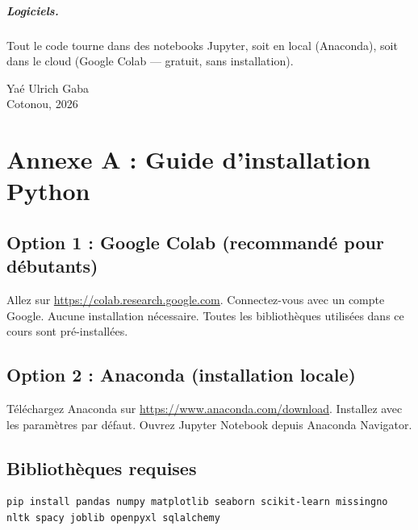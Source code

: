 \documentclass[12pt,a4paper,twoside]{book}
\begin{document}
\paragraph{Logiciels.} Tout le code tourne dans des notebooks Jupyter, soit en local (Anaconda), soit dans le cloud (Google Colab --- gratuit, sans installation).

\vfill
\noindent Yaé Ulrich Gaba\\
Cotonou, 2026

\mainmatter












\backmatter

\chapter*{Annexe A : Guide d'installation Python}

\section*{Option 1 : Google Colab (recommand\'e pour d\'ebutants)}
Allez sur \url{https://colab.research.google.com}. Connectez-vous avec un compte Google. Aucune installation n\'ecessaire. Toutes les biblioth\`eques utilis\'ees dans ce cours sont pr\'e-install\'ees.

\section*{Option 2 : Anaconda (installation locale)}
T\'el\'echargez Anaconda sur \url{https://www.anaconda.com/download}. Installez avec les param\`etres par d\'efaut. Ouvrez Jupyter Notebook depuis Anaconda Navigator.

\section*{Biblioth\`eques requises}
\begin{verbatim}
pip install pandas numpy matplotlib seaborn scikit-learn missingno nltk spacy joblib openpyxl sqlalchemy
\end{verbatim}
\end{document}
